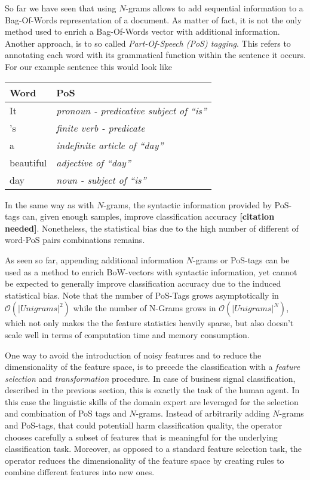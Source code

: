 So far we have seen that using $N$-grams allows to add sequential information to a Bag-Of-Words representation of a document. 
As matter of fact, it is not the only method used to enrich a Bag-Of-Words
vector with additional information. Another approach, is to so called
\emph{Part-Of-Speech (PoS) tagging}. This refers to annotating each word with
its grammatical function within the sentence it occurs. For our example sentence this would
 look like

\begin{center}
\begin{tabular}{|l|l|}
\hline
\textbf{Word} & \textbf{PoS} \\
\hline 
It 		  & \emph{pronoun - predicative subject of ``is''} \\
's 		  & \emph{finite verb - predicate} \\ 
a 		  & \emph{indefinite article of ``day''}  \\
beautiful & \emph{adjective of ``day''} \\
day		  & \emph{noun - subject of ``is''} \\
\hline
\end{tabular}
\end{center}

In the same way as with $N$-grams, the syntactic information provided by PoS-tags
can, given enough samples, improve classification accuracy \textbf{[citation
needed]}.
Nonetheless, the statistical bias due to the high number of different of
word-PoS pairs combinations remains.

As seen so far, appending additional information $N$-grams or PoS-tags can be used as a method
to enrich BoW-vectors with syntactic information, yet cannot be
expected to generally improve classification accuracy due to the induced
statistical bias. Note that the number of PoS-Tags grows asymptotically 
in $\mathcal{O}(|Unigrams|^2)$ while the number of N-Grams grows in
$\mathcal{O}(|Unigrams|^N)$, which not only makes the the feature statistics
heavily sparse, but also doesn't scale well in terms of computation time and memory consumption.

One way to avoid the introduction of noisy features and to reduce the
dimensionality of the feature space, is to precede the classification with a
\emph{feature selection} and \emph{transformation} procedure. In case of
business signal classification, described in the previous section, this is
exactly the task of the human agent. In this case the linguistic skills of the 
domain expert are leveraged for the selection and combination of PoS tags
and $N$-grams. Instead of arbitrarily adding $N$-grams and PoS-tags, that
could potentiall harm classification quality, the operator chooses carefully a
subset of features that is meaningful for the underlying classification task. 
Moreover, as opposed to a standard feature selection task, the operator reduces
the dimensionality of the feature space by creating rules to combine different 
features into new ones.

